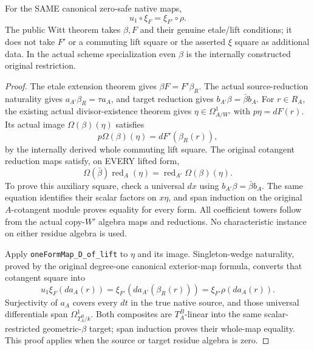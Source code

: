 \begin{theorem}
\label{thm:di-witt-native-arbitrary-restriction-xi}
\leanok
{}
For the SAME canonical zero-safe native maps,
\[
 u_1\circ\xi_F=\xi_{F'}\circ\rho.
\]
The public Witt theorem takes $\beta,F$ and their genuine etale/lift
conditions; it does not take $F'$ or a commuting lift square or the
asserted $\xi$ square as additional data. In the actual scheme
specialization even $\beta$ is the internally constructed original restriction.
\end{theorem}
\begin{proof}
The etale extension theorem gives
$\beta F=F'\beta_R$. The actual source-reduction naturality gives
$a_{A'}\beta_R=\tau a_A$, and target reduction gives
$b_{A'}\beta=\bar\beta b_A$.
For $r\in R_A$, the existing actual divisor-existence theorem gives
$\eta\in\Omega^1_{A/W'}$ with $p\eta=dF(r)$.
Its actual image $\Omega(\beta)(\eta)$ satisfies
\[
 p\Omega(\beta)(\eta)=dF'(\beta_R(r)),
\]
by the internally derived whole commuting lift square.
The original cotangent reduction maps satisfy, on EVERY lifted form,
\[
 \Omega(\bar\beta)\operatorname{red}_A(\eta)
   =\operatorname{red}_{A'}\Omega(\beta)(\eta).
\]
To prove this auxiliary square, check a universal $dx$ using
$b_{A'}\beta=\bar\beta b_A$. The same equation identifies their
scalar factors on $x\eta$, and span induction on the original
$A$-cotangent module proves equality for every form. All coefficient
towers follow from the actual copy-$W'$ algebra maps and reductions.
No characteristic instance on either residue algebra is used.

Apply \texttt{oneFormMap\_\allowbreak{}D\_\allowbreak{}of\_\allowbreak{}lift} to $\eta$ and its image.
Singleton-wedge naturality, proved by the original degree-one
canonical exterior-map formula, converts that cotangent square into
\[
 u_1\xi_F(d a_A(r))=\xi_{F'}(d a_{A'}(\beta_R(r)))
                    =\xi_{F'}\rho(d a_A(r)).
\]
Surjectivity of $a_A$ covers every $dt$ in the true native source,
and those universal differentials span $\Omega^1_{T_A^B/k}$.
Both composites are $T_A^B$-linear into the same scalar-restricted
geometric-$\beta$ target; span induction proves their whole-map equality.
This proof applies when the source or target residue algebra is zero.
\end{proof}

